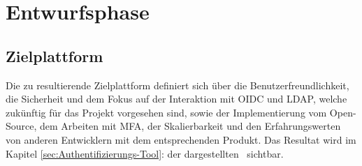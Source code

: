\section{Entwurfsphase} 
\label{sec:Entwurfsphase}

\subsection{Zielplattform}
\label{sec:Zielplattform}
Die zu resultierende Zielplattform definiert sich über die Benutzerfreundlichkeit, die Sicherheit und dem Fokus auf der Interaktion 
mit \acs*{OIDC} und \acs*{LDAP}, welche zukünftig für das Projekt vorgesehen sind, sowie der Implementierung vom Open-Source, dem Arbeiten mit MFA, 
der Skalierbarkeit und den Erfahrungswerten von anderen Entwicklern mit dem entsprechenden Produkt. Das Resultat wird im Kapitel 
\ref{sec:Authentifizierungs-Tool}:  der dargestellten~ sichtbar.


